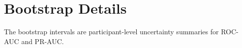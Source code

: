 \section{Bootstrap Details}
The bootstrap intervals are participant-level uncertainty summaries for ROC-AUC and PR-AUC.
